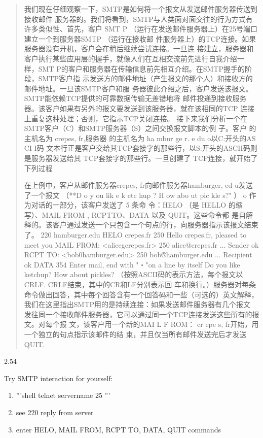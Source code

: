 \documentclass[
]{article}
\begin{document}
\begin{quote}
我们现在仔细观察一下，SMTP是如何将一个报文从发送邮件服务器传送到接收邮件
服务器的。我们将看到，SMTP与人类面对面交往的行为方式有许多类似性、首先，客户
SMT P （运行在发送邮件服务器上）在25号端口建立一个到服务器SMTP
（运行在接收邮
件服务器上）的TCP连接。如果服务器没有开机，客户会在稍后继续尝试连接。一旦连
接建立，服务器和客户执行某些应用层的握手，就像人们在互相交流前先进行自我介绍一
样，SMT
P的客户和服务器在传输信息前先相互介绍。在SMTP握手的阶段，SMTP客户指
示发送方的邮件地址（产生报文的那个人）和接收方的邮件地址。一旦该SMTP客户和服
务器彼此介绍之后，客户发送该报文。SMTP能依赖TCP提供的可靠数据传输无差错地将
邮件投递到接收服务器。该客户如果有另外的报文要发送到该服务器，就在该相同的TCP
连接上重复这种处理；否则，它指示TCP关闭连接。
接下来我们分析一个在SMTP客户（C）和SMTP服务器（S）之间交换报文脚本的例
子。客户 的主机名为 crepes, fr,服务器 的主机名为 ha mbur ge r. e du
o以C:开头的AS CI I码
文本行正是客户交给其TCP套接字的那些行，以S:开头的ASCII码则是服务器发送给其
TCP套接字的那些行。一旦创建了 TCP连接，就开始了下列过程

在上例中，客户从邮件服务器crepes, fr向邮件服务器hamburger, ed
u发送了一个报文 （**D o y ou lik e k etc hup ? H ow abo ut pic kle s?"
） o 作为对话的一部分，该客户发送了 5 条命 令：HELO （是 HELLO
的缩写）、MAIL FROM , RCPTTO、DATA 以及 QUIT。这些命令都
是自解释的。该客户通过发送一个只包含一个句点的行，向服务器指示该报文结束了。
220 hamburger.edu HELO crepes.fr 250 Hello crepes.fr, pleased to meet
you MAIL FROM: \textless alicegcrepes.fr\textgreater{} 250
alice@crepes.fr ... Sender ok RCPT TO:
\textless bob0hamburger.edu\textgreater{} 250 bob®hamburger.edu ...
Recipient ok DATA 354 Enter mail, end with "・"on a line by itself Do
you like ketchup? How about pickles?
（按照ASCII码的表示方法，每个报文以CRLF.
CRLF结束，其中的CR和LF分别表示回
车和换行。）服务器对每条命令做出回答，其中每个回答含有一个回答码和一些（可选的）英文解释，我们在这里指出SMTP用的是持续连接：如果发送邮件服务器有几个报文
发往同一个接收邮件服务器，它可以通过同一个TCP连接发送这些所有的报文。对每个报
文，该客户用一个新的MAI L F ROM： cr epe s,
fr开始，用一个独立的句点指示该邮件的结
束，并且仅当所有邮件发送完后才发送QUIT.
\end{quote}

2.54

Try SMTP interaction for yourself:

\begin{enumerate}
\def\labelenumi{\arabic{enumi}.}
\item
  '''shell telnet servername 25 '''
\item
  see 220 reply from server
\item
  enter HELO, MAIL FROM, RCPT TO, DATA, QUIT commands
\end{enumerate}
\end{document}
